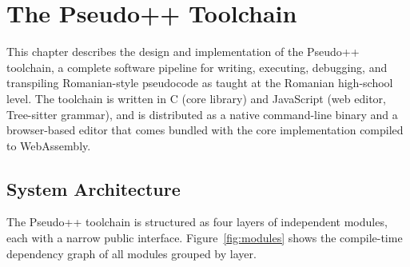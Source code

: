 \chapter{The Pseudo++ Toolchain}
\label{chap:implementation}

This chapter describes the design and implementation of the Pseudo++ toolchain,
a complete software pipeline for writing, executing, debugging, and transpiling
Romanian-style pseudocode as taught at the Romanian high-school level.
The toolchain is written in C (core library) and JavaScript (web editor,
Tree-sitter grammar), and is distributed as a native command-line binary
and a browser-based editor that comes bundled with the core implementation
compiled to WebAssembly.

\section{System Architecture}
\label{sec:architecture}

The Pseudo++ toolchain is structured as four layers of independent modules,
each with a narrow public interface. Figure~\ref{fig:modules} shows the
compile-time dependency graph of all modules grouped by layer.

